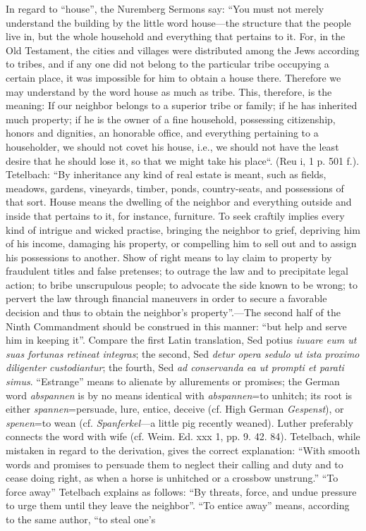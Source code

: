 In regard to “house”, the Nuremberg Sermons say: “You must not merely understand the building by the little word house—the structure that the people live in, but the whole household and everything
that pertains to it. For, in the Old Testament, the cities and villages were distributed among the Jews according to tribes, and if any one did not belong to the particular tribe occupying a certain place, it was impossible for him to obtain a house there. Therefore we may understand by the word house as much as tribe. This, therefore, is the meaning: If our neighbor belongs to a superior tribe or family; if he has inherited much property; if he is the owner of a fine household, possessing citizenship, honors and dignities, an honorable office, and everything pertaining to a householder, we should not covet his house, i.e., we should not have the least desire that he should lose it, so that we might take his place“. (Reu i, 1 p. 501 f.). Tetelbach: “By inheritance any kind of real estate is meant, such as fields, meadows, gardens, vineyards, timber, ponds, country-seats, and possessions of that sort. House means the dwelling of the neighbor and everything outside and inside that pertains to it, for instance, furniture. To seek craftily implies every kind of intrigue and wicked practise, bringing the neighbor to grief, depriving him of his income, damaging his property, or compelling him to sell out and to assign his possessions to another. Show of right means to lay claim to property by fraudulent titles and false pretenses; to outrage the law and to precipitate legal action; to bribe unscrupulous people; to advocate the side known to be wrong; to pervert the law through financial maneuvers in order to secure a favorable decision and thus to obtain the neighbor’s property”.—The second half of the Ninth Commandment should be construed in this manner: “but help and serve him in keeping it”. Compare the first Latin translation, Sed potius \emph{iuuare eum ut suas fortunas retineat integras}; the second, Sed \emph{detur opera sedulo ut ista proximo diligenter custodiantur}; the fourth, Sed \emph{ad conservanda ea ut prompti et parati simus}. “Estrange” means to alienate by allurements or promises; the German word \emph{abspannen} is by no means identical with \emph{abspannen}=to unhitch; its root is either \emph{spannen}=persuade, lure, entice, deceive (cf. High German \emph{Gespenst}), or \emph{spenen}=to wean (cf. \emph{Spanferkel}—a little pig recently weaned). Luther preferably connects the word with wife (cf. Weim. Ed. xxx 1, pp. 9. 42. 84). Tetelbach, while mistaken in regard to the derivation, gives the correct explanation: “With smooth words and promises to persuade them to neglect their calling and duty and to cease doing right, as when a horse is unhitched or a crossbow unstrung.” “To force away” Tetelbach explains as follows: “By threats, force, and undue pressure to urge them until they leave the neighbor”. “To entice away” means, according to the same author, “to steal one’s
